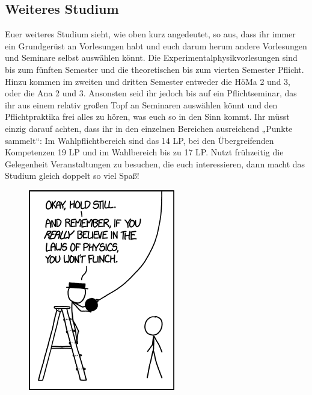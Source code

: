 \subsection{Weiteres Studium}

Euer weiteres Studium sieht, wie oben kurz angedeutet, so aus, dass ihr immer ein Grundgerüst an Vorlesungen habt und euch darum herum andere Vorlesungen und Seminare selbst auswählen könnt. Die Experimentalphysikvorlesungen sind bis zum fünften Semester und die theoretischen bis zum vierten Semester Pflicht. Hinzu kommen im zweiten und dritten Semester entweder die HöMa 2 und 3, oder die Ana 2 und 3. Ansonsten seid ihr jedoch bis auf ein Pflichtseminar, das ihr aus einem relativ großen Topf an Seminaren auswählen könnt und den Pflichtpraktika frei alles zu hören, was euch so in den Sinn kommt. Ihr müsst einzig darauf achten, dass ihr in den einzelnen Bereichen ausreichend „Punkte sammelt“: Im Wahlpflichtbereich sind das 14 \gls{LP}, bei den Übergreifenden Kompetenzen 19 \gls{LP} und im Wahlbereich bis zu 17 \gls{LP}. Nutzt frühzeitig die Gelegenheit Veranstaltungen zu besuchen, die euch interessieren, dann macht das Studium gleich doppelt so viel Spaß!

\begin{figure}[b]
	\centering
	\includegraphics[width=.75\linewidth]{bilder/laws_of_physics.png}
\end{figure}

